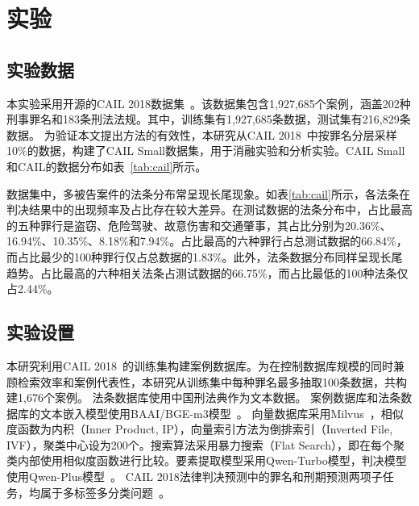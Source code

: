 \section{\heiti 实验}

\subsection{\heiti 实验数据}


本实验采用开源的CAIL 2018数据集~\cite{xiao2018cail2018largescalelegaldataset}。该数据集包含1,927,685个案例，涵盖202种刑事罪名和183条刑法法规。其中，训练集有1,927,685条数据，测试集有216,829条数据。
为验证本文提出方法的有效性，本研究从CAIL 2018~\cite{xiao2018cail2018largescalelegaldataset}中按罪名分层采样10\%的数据，构建了CAIL Small数据集，用于消融实验和分析实验。CAIL Small和CAIL的数据分布如表~\ref{tab:cail}所示。

数据集中，多被告案件的法条分布常呈现长尾现象。如表\ref{tab:cail}所示，各法条在判决结果中的出现频率及占比存在较大差异。在测试数据的法条分布中，占比最高的五种罪行是盗窃、危险驾驶、故意伤害和交通肇事，其占比分别为20.36\%、16.94\%、10.35\%、8.18\%和7.94\%。占比最高的六种罪行占总测试数据的66.84\%，而占比最少的100种罪行仅占总数据的1.83\%。此外，法条数据分布同样呈现长尾趋势。占比最高的六种相关法条占测试数据的66.75\%，而占比最低的100种法条仅占2.44\%。

\subsection{\heiti 实验设置}
本研究利用CAIL 2018~\cite{xiao2018cail2018largescalelegaldataset}的训练集构建案例数据库。为在控制数据库规模的同时兼顾检索效率和案例代表性，本研究从训练集中每种罪名最多抽取100条数据，共构建1,676个案例。
法条数据库使用中国刑法典作为文本数据。
案例数据库和法条数据库的文本嵌入模型使用BAAI/BGE-m3模型~\cite{chenBGEM3EmbeddingMultiLingual2024}。
向量数据库采用Milvus~\cite{2022manu,2021milvus}，相似度函数为内积（Inner Product, IP），向量索引方法为倒排索引（Inverted File, IVF），聚类中心设为200个。搜索算法采用暴力搜索（Flat Search），即在每个聚类内部使用相似度函数进行比较。要素提取模型采用Qwen-Turbo模型，判决模型使用Qwen-Plus模型~\cite{qwenQwen25TechnicalReport2025}。
CAIL 2018法律判决预测中的罪名和刑期预测两项子任务，均属于多标签多分类问题~\cite{xiao2018cail2018}。


